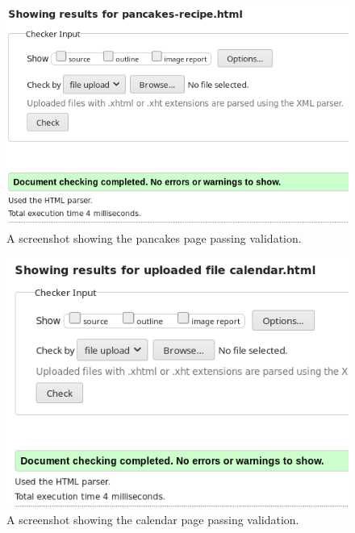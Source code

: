\documentclass[a4paper]{scrartcl}
\begin{document}
\begin{figure}[h!]
    \begin{center}
        \includegraphics[scale=0.2]{images/pancakes-validated.png}
        \caption{A screenshot showing the pancakes page passing validation.}
        \label{fig:pancakes-validated}
    \end{center}
\end{figure}

\begin{figure}[h!]
    \begin{center}
        \includegraphics[scale=0.2]{images/calendar-validated.png}
        \caption{A screenshot showing the calendar page passing validation.}
        \label{fig:calendar-validated}
    \end{center}
\end{figure}
\end{document}
